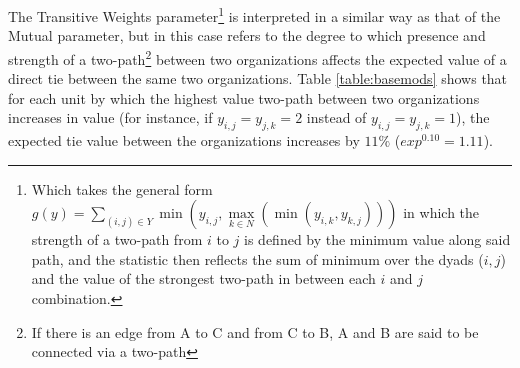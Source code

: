 \documentclass[12pt,a4paper,titlepage]{article}
\begin{document}
The Transitive Weights parameter\footnote{Which takes the general form $g(y) = \sum_{(i,j) \in Y} \min(y_{i,j},\max\limits_{k \in N}(\min(y_{i,k},y_{k,j})))$ in which the strength of a two-path from $i$ to $j$ is defined by the minimum value along said path, and the statistic then reflects the sum of minimum over the dyads ($i, j$) and the value of the strongest two-path in between each $i$ and $j$ combination.} is interpreted in a similar way as that of the Mutual parameter, but in this case refers to the degree to which presence and strength of a two-path\footnote{If there is an edge from A to C and from C to B, A and B are said to be connected via a two-path} between two organizations affects the expected value of a direct tie between the same two organizations. Table \ref{table:basemods} shows that for each unit by which the highest value two-path between two organizations increases in value (for instance, if $y_{i,j} = y_{j,k} = 2$ instead of $y_{i,j} = y_{j,k} = 1$), the expected tie value between the organizations increases by $11\%$ ($exp^{0.10} = 1.11$).
\end{document}
